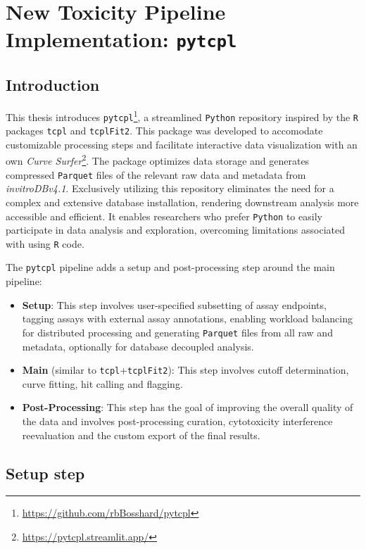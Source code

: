\section{New Toxicity Pipeline Implementation: \texttt{pytcpl}}\label{sec:pytcpl}
\subsection{Introduction} 
This thesis introduces \texttt{pytcpl}\footnote{\url{https://github.com/rbBosshard/pytcpl}}, a streamlined \texttt{Python} repository inspired by the \texttt{R} packages \texttt{tcpl} and \texttt{tcplFit2}. This package was developed to accomodate customizable processing steps and facilitate interactive data visualization with an own \emph{Curve Surfer}\footnote{\url{https://pytcpl.streamlit.app/}}. The package optimizes data storage and generates compressed \texttt{Parquet} files of the relevant raw data and metadata from \emph{invitroDBv4.1}. Exclusively utilizing this repository eliminates the need for a complex and extensive database installation, rendering downstream analysis more accessible and efficient. It enables researchers who prefer \texttt{Python} to easily participate in data analysis and exploration, overcoming limitations associated with using \texttt{R} code.

The \texttt{pytcpl} pipeline adds a setup and post-processing step around the main pipeline:
\begin{itemize}
    \item \textbf{Setup}: This step involves user-specified subsetting of assay endpoints, tagging assays with external assay annotations, enabling workload balancing for distributed processing and generating \texttt{Parquet} files from all raw and metadata, optionally for database decoupled analysis.
    \item \textbf{Main} (similar to \texttt{tcpl}+\texttt{tcplFit2}): This step involves cutoff determination, curve fitting, hit calling and flagging.
    \item \textbf{Post-Processing}: This step has the goal of improving the overall quality of the data and involves post-processing curation, cytotoxicity interference reevaluation and the custom export of the final results.
\end{itemize}

\subsection{Setup step}\label{sec:subset_data}
